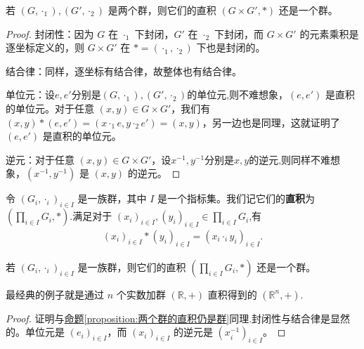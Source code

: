 \documentclass[../../main.tex]{subfiles}
\begin{document}
\begin{proposition}[两个群的直积仍是群]\label{proposition:两个群的直积仍是群}
若 $(G,\cdot_1),(G',\cdot_2)$ 是两个群，则它们的直积 $(G\times G',*)$ 还是一个群。
\end{proposition}
\begin{proof}
封闭性：因为 $G$ 在 $\cdot_1$ 下封闭，$G'$ 在 $\cdot_2$ 下封闭，而 $G\times G'$ 的元素乘积是逐坐标定义的，则 $G\times G'$ 在 $* = (\cdot_1,\cdot_2)$ 下也是封闭的。

结合律：同样，逐坐标有结合律，故整体也有结合律。

单位元：设$e,e'$分别是$(G,\cdot_1),(G',\cdot_2)$的单位元,则不难想象，$(e,e')$ 是直积的单位元。对于任意 $(x,y)\in G\times G'$，我们有 $(x,y)*(e,e')=(x\cdot_1 e,y\cdot_2 e')=(x,y)$，另一边也是同理，这就证明了 $(e,e')$ 是直积的单位元。

逆元：对于任意 $(x,y)\in G\times G'$，设$x^{-1},y^{-1}$分别是$x,y$的逆元,则同样不难想象，$(x^{-1},y^{-1})$ 是 $(x,y)$ 的逆元。 

\end{proof}

\begin{definition}[一族群的直积]
令 $(G_i,\cdot_i)_{i\in I}$ 是一族群，其中 $I$ 是一个指标集。我们记它们的\textbf{直积}为 $(\prod_{i\in I}G_i,*)$.满足对于 $(x_i)_{i\in I},(y_i)_{i\in I}\in\prod_{i\in I}G_i$,有
\begin{align*}
(x_i)_{i\in I}*(y_i)_{i\in I}=(x_i\cdot_i y_i)_{i\in I}.
\end{align*}
\end{definition}

\begin{proposition}[一族群的直积仍是群]\label{proposition:一族群的直积仍是群}
若 $(G_i,\cdot_i)_{i\in I}$ 是一族群，则它们的直积 $(\prod_{i\in I}G_i,*)$ 还是一个群。  
\end{proposition}
\begin{note}
最经典的例子就是通过 $n$ 个实数加群 $(\mathbb{R},+)$ 直积得到的 $(\mathbb{R}^n,+)$.
\end{note}
\begin{proof}
证明与\hyperref[proposition:两个群的直积仍是群]{命题\ref{proposition:两个群的直积仍是群}}同理.封闭性与结合律是显然的。单位元是 $(e_i)_{i\in I}$，而 $(x_i)_{i\in I}$ 的逆元是 $(x_i^{-1})_{i\in I}$。 

\end{proof}
\end{document}
